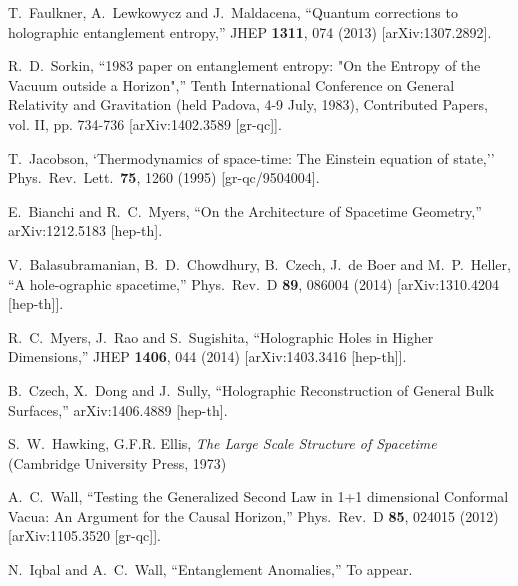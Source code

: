 \documentclass[12pt]{article}
\theoremstyle{remark}
\numberwithin{equation}{section}
\numberwithin{equation}{section}
\begin{document}
\begin{thebibliography}{99}
  T.~Faulkner, A.~Lewkowycz and J.~Maldacena,
  ``Quantum corrections to holographic entanglement entropy,''
  JHEP {\bf 1311}, 074 (2013)
  [arXiv:1307.2892].

  R.~D.~Sorkin,
  ``1983 paper on entanglement entropy: "On the Entropy of the Vacuum outside a Horizon",''
  Tenth International Conference on General Relativity and
  Gravitation (held Padova, 4-9 July, 1983), Contributed Papers, vol. II, pp.
  734-736
  [arXiv:1402.3589 [gr-qc]].

  T.~Jacobson,
  `Thermodynamics of space-time: The Einstein equation of state,''
  Phys.\ Rev.\ Lett.\  {\bf 75}, 1260 (1995)
  [gr-qc/9504004].

  E.~Bianchi and R.~C.~Myers,
  ``On the Architecture of Spacetime Geometry,''
  arXiv:1212.5183 [hep-th].

  V.~Balasubramanian, B.~D.~Chowdhury, B.~Czech, J.~de Boer and M.~P.~Heller,
  ``A hole-ographic spacetime,''
  Phys.\ Rev.\ D {\bf 89}, 086004 (2014)
  [arXiv:1310.4204 [hep-th]].

  R.~C.~Myers, J.~Rao and S.~Sugishita,
  ``Holographic Holes in Higher Dimensions,''
  JHEP {\bf 1406}, 044 (2014)
  [arXiv:1403.3416 [hep-th]].

  B.~Czech, X.~Dong and J.~Sully,
  ``Holographic Reconstruction of General Bulk Surfaces,''
  arXiv:1406.4889 [hep-th].

  S.~W.~Hawking, G.F.R. Ellis,
  \emph{The Large Scale Structure of Spacetime}
  (Cambridge University Press, 1973)


  A.~C.~Wall,
  ``Testing the Generalized Second Law in 1+1 dimensional Conformal Vacua: An Argument for the Causal Horizon,''
  Phys.\ Rev.\ D {\bf 85}, 024015 (2012)
  [arXiv:1105.3520 [gr-qc]].


  N.~Iqbal and A.~C.~Wall, ``Entanglement Anomalies,''
  To appear.



\end{thebibliography}
\end{document}
